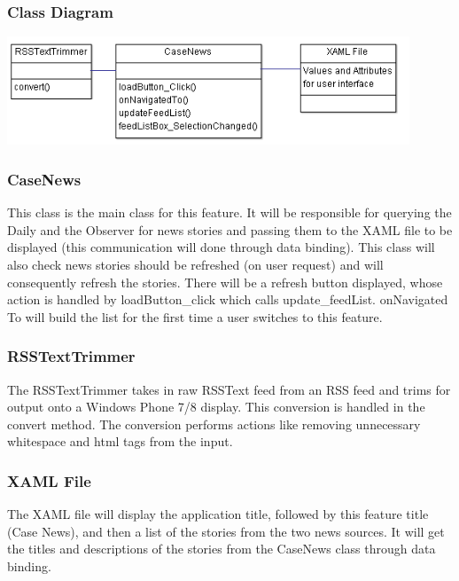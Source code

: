 \documentclass[pdftex,12pt,letter]{article}
\begin{document}
\subsubsection{Class Diagram}
\includegraphics[width=120mm]{CaseNewsCD.png}
\subsubsection{CaseNews}
This class is the main class for this feature. It will be responsible for querying the Daily and the Observer for news stories and passing them to the
XAML file to be displayed (this communication will done through data binding). This class will also check news stories should be refreshed (on user
request) and will consequently refresh the stories. There will be a refresh
button displayed, whose action is handled by loadButton\_click which calls
update\_feedList. onNavigated To will build the list for the first time a user
switches to this feature.
\subsubsection{RSSTextTrimmer}
The RSSTextTrimmer takes in raw RSSText feed from an RSS feed and
trims for output onto a Windows Phone 7/8 display. This conversion is handled in the convert method. The conversion performs actions like removing
unnecessary whitespace and html tags from the input.
\subsubsection{XAML File}
The XAML file will display the application title, followed by this feature title
(Case News), and then a list of the stories from the two news sources. It will
get the titles and descriptions of the stories from the CaseNews class through
data binding.

\end{document}
